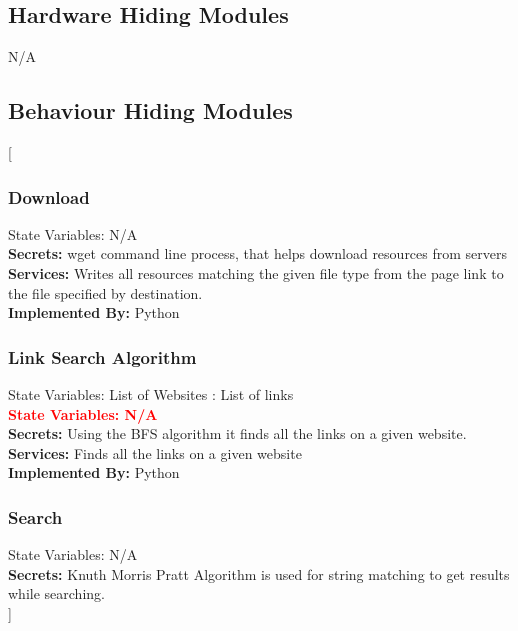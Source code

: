 \documentclass[titlepage]{article}
\newcommand{\group}[1]{{\leavevmode\color{red}[#1]}}
\begin{document}
\subsection{Hardware Hiding Modules}
N/A
\subsection{Behaviour Hiding Modules}
\group{
\subsubsection{Download }

State Variables: N/A\\

\textbf{Secrets:}
wget command line process, that helps download resources from servers\\

\textbf{Services:}
Writes all resources matching the given file type from the page link to the file specified by destination.\\

\textbf{Implemented By:}
Python

\subsubsection{Link Search Algorithm}
State Variables: List of Websites : List of links\\

\textcolor{red}{\textbf{State Variables: N/A}}\\
\textbf{Secrets:}
Using the BFS algorithm it finds all the links on a given website.\\

\textbf{Services:}
Finds all the links on a given website\\

\textbf{Implemented By:}
Python

\subsubsection{Search}
State Variables: N/A\\

\textbf{Secrets:}
 Knuth Morris Pratt Algorithm is used for string matching to get results while searching.\\ 

}
\end{document}
